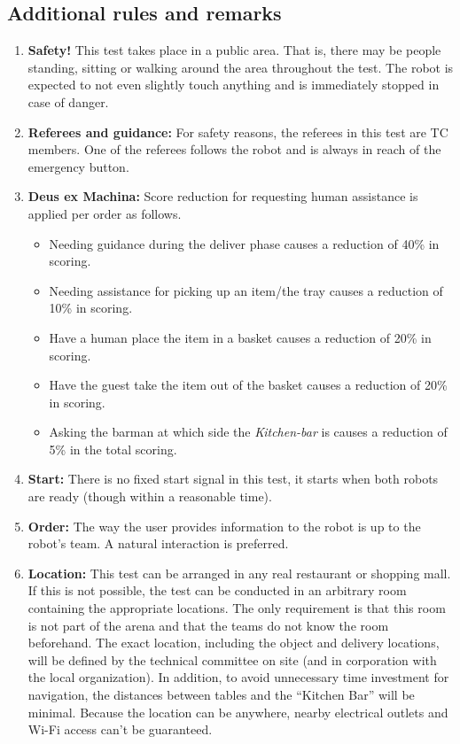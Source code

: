 \subsection{Additional rules and remarks}
\begin{enumerate}[nosep]
	\item \textbf{Safety!} This test takes place in a public area. That is, there may be people standing, sitting or walking around the area throughout the test. The robot is expected to not even slightly touch anything and is immediately stopped in case of danger.

	\item \textbf{Referees and guidance:} For safety reasons, the referees in this test are TC members. One of the referees follows the robot and is always in reach of the emergency button.

    \item \textbf{Deus ex Machina:} Score reduction for requesting human assistance is applied per order as follows.
        \begin{itemize}[nosep]
          \item Needing guidance during the deliver phase causes a reduction of 40\% in scoring.
          \item Needing assistance for picking up an item/the tray causes a reduction of 10\% in scoring.
          \item Have a human place the item in a basket causes a reduction of 20\% in scoring.
          \item Have the guest take the item out of the basket causes a reduction of 20\% in scoring.
          \item Asking the barman at which side the \textit{Kitchen-bar} is causes a reduction of 5\% in the total scoring.
        \end{itemize}

	\item \textbf{Start:} There is no fixed start signal in this test, it starts when both robots are ready (though within a reasonable time).

	\item \textbf{Order:} The way the user provides information to the robot is up to the robot's team. A natural interaction is preferred.

	\item \textbf{Location:} This test can be arranged in any real restaurant or shopping mall. If this is not possible, the test can be conducted in an arbitrary room containing the appropriate locations. The only requirement is that this room is not part of the arena and that the teams do not know the room beforehand.
	  The exact location, including the object and delivery locations, will be defined by the technical committee on site (and in corporation with the local organization). In addition, to avoid unnecessary time investment for navigation, the distances between tables and the \enquote{Kitchen Bar} will be minimal. Because the location can be anywhere, nearby electrical outlets and Wi-Fi access can't be guaranteed.


\end{enumerate}
